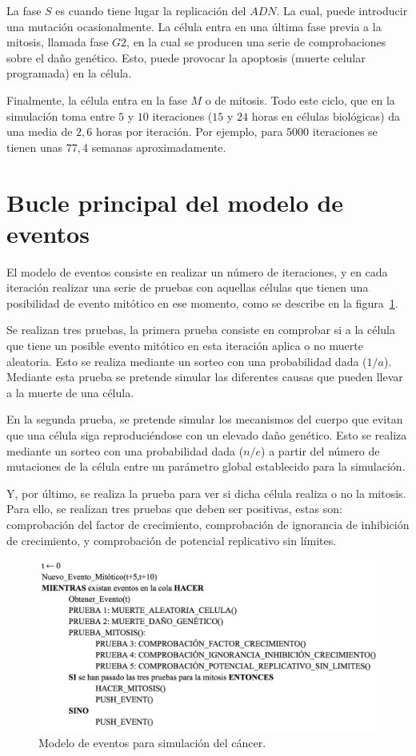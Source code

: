 La fase $S$ es cuando tiene lugar la replicación del $ADN$. La cual, puede introducir una mutación ocasionalmente.
La célula entra en una última fase previa a la mitosis, llamada fase $G2$, en la cual se producen una serie
de comprobaciones sobre el daño genético. Esto, puede provocar la apoptosis (muerte celular programada) en la célula.

Finalmente, la célula entra en la fase $M$ o de mitosis. Todo este ciclo, que en la simulación toma entre $5$ y $10$ iteraciones
($15$ y $24$ horas en células biológicas) da una media de $2,6$ horas por iteración. Por ejemplo, para $5000$ iteraciones se tienen
unas $77,4$ semanas aproximadamente.

\section{Bucle principal del modelo de eventos}

El modelo de eventos consiste en realizar un número de iteraciones, y en cada iteración realizar
una serie de pruebas con aquellas células que tienen una posibilidad de evento mitótico en ese
momento, como se describe en la figura~\ref{fig:eventmodel}.

Se realizan tres pruebas, la primera prueba consiste en comprobar si a la célula que tiene
un posible evento mitótico en esta iteración aplica o no muerte aleatoria. Esto se realiza mediante un
sorteo con una probabilidad dada ($1/a$). Mediante esta prueba se pretende simular las diferentes
causas que pueden llevar a la muerte de una célula.

En la segunda prueba, se pretende simular los mecanismos del cuerpo que evitan que una célula
siga reproduciéndose con un elevado daño genético. Esto se realiza mediante un sorteo con una probabilidad
dada ($n/e$) a partir del número de mutaciones de la célula entre un parámetro global establecido para
la simulación.

Y, por último, se realiza la prueba para ver si dicha célula realiza o no la mitosis.
Para ello, se realizan tres pruebas que deben ser positivas, estas son: comprobación del factor de crecimiento,
comprobación de ignorancia de inhibición de crecimiento, y comprobación de potencial replicativo sin límites.

\begin{figure}[h]
\centering
\includegraphics[scale=0.8]{figures/pseudo_alg}
\caption{Modelo de eventos para simulación del cáncer.}
\label{fig:eventmodel}
\end{figure}

